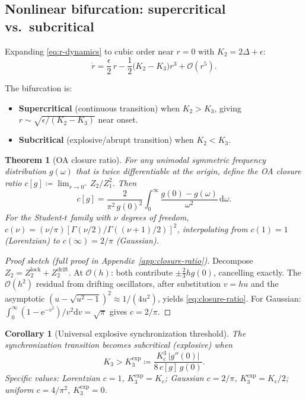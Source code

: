 \documentclass{article}
\newtheorem{theorem}{Theorem}
\newtheorem{corollary}{Corollary}
\newcommand{\dd}{\mathrm{d}}
\newcommand{\ee}{\mathrm{e}}
\newcommand{\Order}{\mathcal{O}}
\newcommand{\Kc}{K_{\mathrm{c}}}
\begin{document}
\subsection{Nonlinear bifurcation: supercritical vs.\ subcritical}

Expanding \eqref{eq:r-dynamics} to cubic order near $r=0$ with
$K_2 = 2\Delta + \epsilon$:
\begin{equation}
  \dot{r} = \frac{\epsilon}{2}\,r
  - \frac{1}{2}\bigl(K_2 - K_3\bigr)r^3 + \Order(r^5).
  \label{eq:cubic-normal}
\end{equation}

The bifurcation is:
\begin{itemize}
  \item \textbf{Supercritical} (continuous transition) when $K_2 > K_3$,
    giving $r\sim\sqrt{\epsilon/(K_2-K_3)}$ near onset.
  \item \textbf{Subcritical} (explosive/abrupt transition) when $K_2 < K_3$.
\end{itemize}

\begin{theorem}[OA closure ratio]
\label{thm:closure-ratio}
  For any unimodal symmetric frequency distribution $g(\omega)$ that is
  twice differentiable at the origin, define the \emph{OA closure ratio}
  $c[g] \coloneqq \lim_{r\to 0^+} Z_2/Z_1^2$.  Then
  \begin{equation}
    \boxed{c[g] = \frac{2}{\pi^2\,g(0)^2}
      \int_0^\infty \frac{g(0)-g(\omega)}{\omega^2}\,\dd\omega.}
    \label{eq:closure-ratio}
  \end{equation}
  For the Student-$t$ family with $\nu$ degrees of freedom,
  $c(\nu) = (\nu/\pi)[\Gamma(\nu/2)/\Gamma((\nu\!+\!1)/2)]^2$,
  interpolating from $c(1)=1$ (Lorentzian) to $c(\infty)=2/\pi$ (Gaussian).
\end{theorem}

\begin{proof}[Proof sketch (full proof in Appendix~\ref{app:closure-ratio})]
  Decompose $Z_2 = Z_2^{\mathrm{lock}} + Z_2^{\mathrm{drift}}$.
  At $\Order(h)$: both contribute $\pm\tfrac{2}{3}hg(0)$, cancelling exactly.
  The $\Order(h^2)$ residual from drifting oscillators, after substitution
  $v\!=\!hu$ and the asymptotic $(u\!-\!\sqrt{u^2\!-\!1})^2 \approx 1/(4u^2)$,
  yields \eqref{eq:closure-ratio}.  For Gaussian: $\int_0^\infty
  (1\!-\!\ee^{-v^2})/v^2\dd v = \sqrt\pi$ gives $c=2/\pi$.
\end{proof}

\begin{corollary}[Universal explosive synchronization threshold]
\label{thm:explosive}
  The synchronization transition becomes subcritical (explosive) when
  \begin{equation}
    \boxed{K_3 > K_3^{\mathrm{exp}}
      \coloneqq \frac{\Kc^3\,|g''(0)|}{8\,c[g]\,g(0)}.}
    \label{eq:K3-explosive-universal}
  \end{equation}
  Specific values:
  Lorentzian $c\!=\!1$, $K_3^{\mathrm{exp}}\!=\!\Kc$;\;
  Gaussian $c\!=\!2/\pi$, $K_3^{\mathrm{exp}}\!=\!\Kc/2$;\;
  uniform $c\!=\!4/\pi^2$, $K_3^{\mathrm{exp}}\!=\!0$.
\end{corollary}
\end{document}

